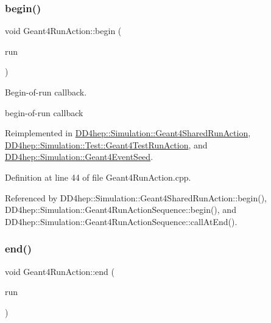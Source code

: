 \subsubsection{\texorpdfstring{begin()}{begin()}}
{\footnotesize\ttfamily void Geant4\+Run\+Action\+::begin (\begin{DoxyParamCaption}\item[{const G4\+Run $\ast$}]{run }\end{DoxyParamCaption})\hspace{0.3cm}{\ttfamily [virtual]}}



Begin-\/of-\/run callback. 

begin-\/of-\/run callback 

Reimplemented in \hyperlink{class_d_d4hep_1_1_simulation_1_1_geant4_shared_run_action_a8206dc20bbe8ace921f4e97c7159872a}{D\+D4hep\+::\+Simulation\+::\+Geant4\+Shared\+Run\+Action}, \hyperlink{class_d_d4hep_1_1_simulation_1_1_test_1_1_geant4_test_run_action_a1df121c6a80d42e72c898e7303d5c64e}{D\+D4hep\+::\+Simulation\+::\+Test\+::\+Geant4\+Test\+Run\+Action}, and \hyperlink{class_d_d4hep_1_1_simulation_1_1_geant4_event_seed_a297ed6d4c7366df16c151f31bee46028}{D\+D4hep\+::\+Simulation\+::\+Geant4\+Event\+Seed}.



Definition at line 44 of file Geant4\+Run\+Action.\+cpp.



Referenced by D\+D4hep\+::\+Simulation\+::\+Geant4\+Shared\+Run\+Action\+::begin(), D\+D4hep\+::\+Simulation\+::\+Geant4\+Run\+Action\+Sequence\+::begin(), and D\+D4hep\+::\+Simulation\+::\+Geant4\+Run\+Action\+Sequence\+::call\+At\+End().

\hypertarget{class_d_d4hep_1_1_simulation_1_1_geant4_run_action_a71c7dbfb3451a9d6cc594f0174a631a2}{}\label{class_d_d4hep_1_1_simulation_1_1_geant4_run_action_a71c7dbfb3451a9d6cc594f0174a631a2} 
\subsubsection{\texorpdfstring{end()}{end()}}
{\footnotesize\ttfamily void Geant4\+Run\+Action\+::end (\begin{DoxyParamCaption}\item[{const G4\+Run $\ast$}]{run }\end{DoxyParamCaption})\hspace{0.3cm}{\ttfamily [virtual]}}



